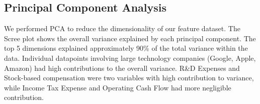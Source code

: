 \documentclass[11pt,]{article}
\begin{document}
\hypertarget{principal-component-analysis-1}{%
\subsection{Principal Component
Analysis}\label{principal-component-analysis-1}}

We performed PCA to reduce the dimensionality of our feature dataset.
The Scree plot shows the overall variance explained by each principal
component. The top 5 dimensions explained approximately 90\% of the
total variance within the data. Individual datapoints involving large
technology companies (Google, Apple, Amazon) had high contributions to
the overall variance. R\&D Expenses and Stock-based compensation were
two variables with high contribution to variance, while Income Tax
Expense and Operating Cash Flow had more negligible contribution.
\end{document}
